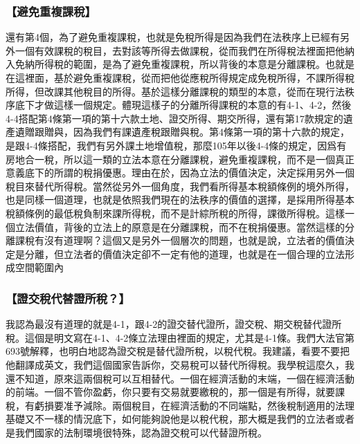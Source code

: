 \documentclass[oneside,sub3section]{ctexbook}
\begin{document}
\hypertarget{ux907fux514dux91cdux8907ux8ab2ux7a05}{%
\subsubsection{【避免重複課稅】}\label{ux907fux514dux91cdux8907ux8ab2ux7a05}}

還有第4個，為了避免重複課稅，也就是免稅所得是因為我們在法秩序上已經有另外一個有效課稅的稅目，去對該等所得去做課稅，從而我們在所得稅法裡面把他納入免納所得稅的範圍，是為了避免重複課稅，所以背後的本意是分離課稅。也就是在這裡面，基於避免重複課稅，從而把他從應稅所得規定成免稅所得，不課所得稅所得，但改課其他稅目的所得。基於這樣分離課稅的類型的本意，從而在現行法秩序底下才做這樣一個規定。體現這樣子的分離所得課稅的本意的有4-1、4-2，然後4-4搭配第4條第一項的第十六款土地、證交所得、期交所得，還有第17款規定的遺產遺贈跟贈與，因為我們有課遺產稅跟贈與稅。第4條第一項的第十六款的規定，是跟4-4條搭配，我們有另外課土地增值稅，那麼105年以後4-4條的規定，因爲有房地合一稅，所以這一類的立法本意在分離課稅，避免重複課稅，而不是一個真正意義底下的所謂的稅捐優惠。理由在於，因為立法的價值決定，決定採用另外一個稅目來替代所得稅。當然從另外一個角度，我們看所得基本稅額條例的境外所得，也是同樣一個道理，也就是依照我們現在的法秩序的價值的選擇，是採用所得基本稅額條例的最低稅負制來課所得稅，而不是計綜所稅的所得，課徵所得稅。這樣一個立法價值，背後的立法上的原意是在分離課稅，而不在稅捐優惠。當然這樣的分離課稅有沒有道理啊？這個又是另外一個層次的問題，也就是說，立法者的價值決定是分離，但立法者的價值決定卻不一定有他的道理，也就是在一個合理的立法形成空間範圍內

\hypertarget{ux8b49ux4ea4ux7a05ux4ee3ux66ffux8b49ux6240ux7a05}{%
\subsubsection{【證交稅代替證所稅？】}\label{ux8b49ux4ea4ux7a05ux4ee3ux66ffux8b49ux6240ux7a05}}

我認為最沒有道理的就是4-1，跟4-2的證交替代證所，證交稅、期交稅替代證所稅。這個是明文寫在4-1、4-2條立法理由裡面的規定，尤其是4-1條。我們大法官第693號解釋，也明白地認為證交稅是替代證所稅，以稅代稅。我建議，看要不要把他翻譯成英文，我們這個國家告訴你，交易稅可以替代所得稅。我學稅這麼久，我還不知道，原來這兩個稅可以互相替代。一個在經濟活動的末端，一個在經濟活動的前端。一個不管你盈虧，你只要有交易就要繳稅的，那一個是有所得，就要課稅，有虧損要准予減除。兩個稅目，在經濟活動的不同端點，然後稅制適用的法理基礎又不一樣的情況底下，如何能夠說他是以稅代稅，那大概是我們的立法者或者是我們國家的法制環境很特殊，認為證交稅可以代替證所稅。
\end{document}
